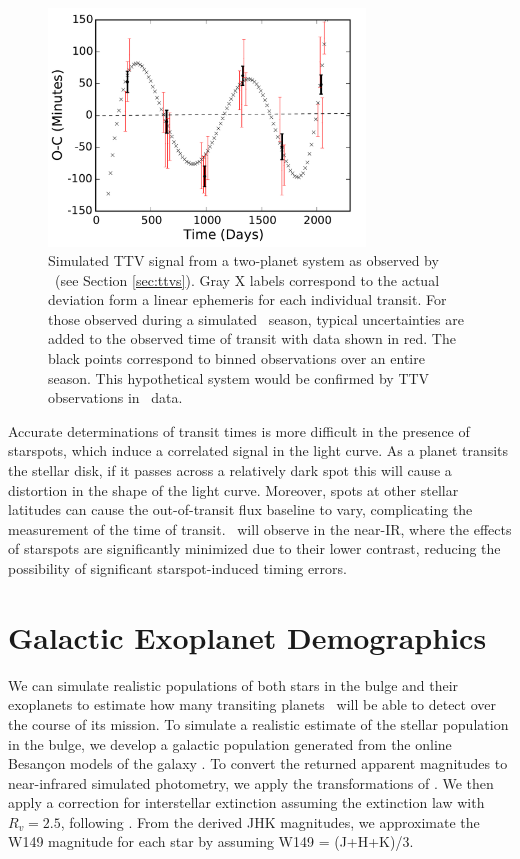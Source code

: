 \begin{figure}[htbp!]
\centerline{\includegraphics[width=0.75\textwidth]{chapter8/f3a.pdf}}
\caption[Simulated TTV signal from a two-planet system as observed by \WF.]{Simulated TTV signal from a two-planet system as observed by \WF\ (see Section \ref{sec:ttvs}). 
Gray X labels correspond to the actual deviation form a linear ephemeris for each 
individual transit. For those observed during a simulated \WF\ season, typical
uncertainties are added to the observed time of transit with data shown in red. The black
points correspond to binned observations over an entire season. This hypothetical system
would be confirmed by TTV observations in \WF\ data.}
\label{fig:ttv}
\end{figure}



Accurate determinations of transit times is more difficult in the presence of 
starspots, which induce a correlated signal in the light curve.
As a planet transits the stellar disk, if it passes across a 
relatively dark spot this will cause a distortion in the shape of the light curve.
Moreover, spots at other stellar latitudes can cause the out-of-transit flux baseline
to vary, complicating the measurement of the time of transit.
\WF\ will observe in the near-IR, where the effects of starspots are significantly 
minimized due to their lower contrast, reducing the possibility of significant 
starspot-induced timing errors.

\section{Galactic Exoplanet Demographics}
\label{ss:yield}


We can simulate realistic populations of both stars in the bulge and their exoplanets 
to estimate how many transiting planets \WF\ will be able to detect over the course of its mission.
To simulate a realistic estimate of the stellar population in the bulge, we develop a 
galactic population generated from the online Besan\c{c}on models of the galaxy \citep{Robin03}.
To convert the returned apparent magnitudes to near-infrared simulated photometry, we
apply the transformations of \citet{Bilir08}. 
We then apply a correction for interstellar extinction assuming the \citet{Cardelli89}
extinction law with $R_v = 2.5$, following \citet{Nataf13}.
From the derived JHK magnitudes, we approximate the W149 magnitude for each star
by assuming W149 = (J+H+K)/3.

